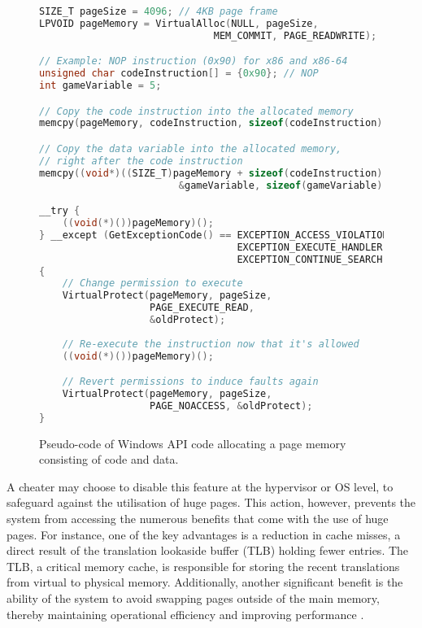\begin{figure}
\centering

\begin{lstlisting}[language=C, basicstyle=\small\ttfamily]
SIZE_T pageSize = 4096; // 4KB page frame
LPVOID pageMemory = VirtualAlloc(NULL, pageSize,
                              MEM_COMMIT, PAGE_READWRITE);

// Example: NOP instruction (0x90) for x86 and x86-64
unsigned char codeInstruction[] = {0x90}; // NOP
int gameVariable = 5;

// Copy the code instruction into the allocated memory
memcpy(pageMemory, codeInstruction, sizeof(codeInstruction));

// Copy the data variable into the allocated memory, 
// right after the code instruction
memcpy((void*)((SIZE_T)pageMemory + sizeof(codeInstruction)),
                        &gameVariable, sizeof(gameVariable));

__try {
    ((void(*)())pageMemory)();
} __except (GetExceptionCode() == EXCEPTION_ACCESS_VIOLATION ? 
                                  EXCEPTION_EXECUTE_HANDLER :
                                  EXCEPTION_CONTINUE_SEARCH) 
{
    // Change permission to execute
    VirtualProtect(pageMemory, pageSize, 
                   PAGE_EXECUTE_READ, 
                   &oldProtect);
    
    // Re-execute the instruction now that it's allowed
    ((void(*)())pageMemory)(); 

    // Revert permissions to induce faults again
    VirtualProtect(pageMemory, pageSize,
                   PAGE_NOACCESS, &oldProtect);
}
\end{lstlisting}
   
\caption{Pseudo-code of Windows API code allocating a page memory consisting of code and data.}
\label{fig:pageFault-code}
\end{figure}

A cheater may choose to disable this feature at the hypervisor or OS level, to safeguard against the utilisation of huge pages. This action, however, prevents the system from accessing the numerous benefits that come with the use of huge pages. For instance, one of the key advantages is a reduction in cache misses, a direct result of the translation lookaside buffer (TLB) holding fewer entries. The TLB, a critical memory cache, is responsible for storing the recent translations from virtual to physical memory. Additionally, another significant benefit is the ability of the system to avoid swapping pages outside of the main memory, thereby maintaining operational efficiency and improving performance \cite{benefits-huge-pages}.


